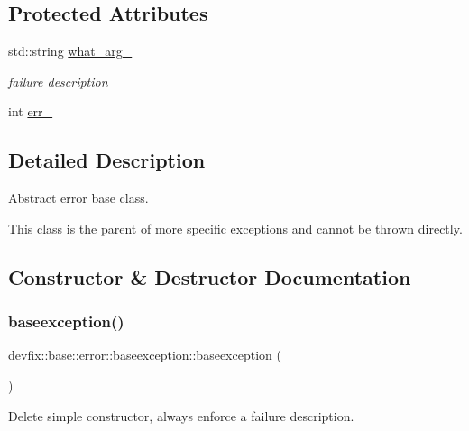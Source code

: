 \subsection*{Protected Attributes}
\begin{DoxyCompactItemize}
\item 
std\+::string \hyperlink{structdevfix_1_1base_1_1error_1_1baseexception_adec18389f27e1d1dae67f80caa1b617b}{what\+\_\+arg\+\_\+}
\begin{DoxyCompactList}\small\item\em failure description \end{DoxyCompactList}\item 
int \hyperlink{structdevfix_1_1base_1_1error_1_1baseexception_aa1f58eb33d67ccf87465656f20b6d640}{err\+\_\+}
\end{DoxyCompactItemize}


\subsection{Detailed Description}
Abstract error base class. 

This class is the parent of more specific exceptions and cannot be thrown directly. 

\subsection{Constructor \& Destructor Documentation}
\mbox{\label{structdevfix_1_1base_1_1error_1_1baseexception_abc1384f68bf47292ab520a96eedec596}} 
\subsubsection{\texorpdfstring{baseexception()}{baseexception()}\hspace{0.1cm}{\footnotesize\ttfamily [1/2]}}
{\footnotesize\ttfamily devfix\+::base\+::error\+::baseexception\+::baseexception (\begin{DoxyParamCaption}{ }\end{DoxyParamCaption})\hspace{0.3cm}{\ttfamily [delete]}}

Delete simple constructor, always enforce a failure description. \mbox{\label{structdevfix_1_1base_1_1error_1_1baseexception_a34ac448cc55e4d9ce0ee4495abbb0f86}} 
